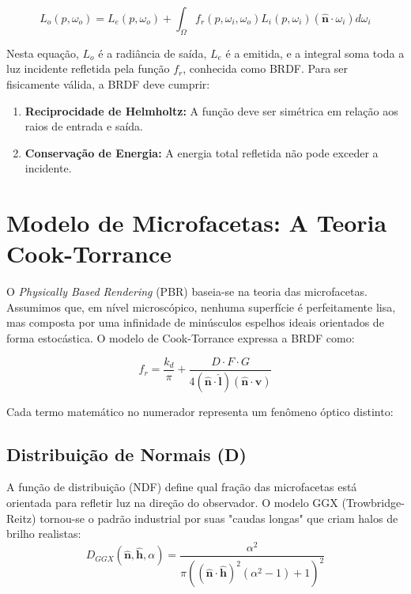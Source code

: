 \begin{equation}
    L_o(p, \omega_o) = L_e(p, \omega_o) + \int_{\Omega} f_r(p, \omega_i, \omega_o) L_i(p, \omega_i) (\hat{\mathbf{n}} \cdot \omega_i) d\omega_i
\end{equation}

Nesta equação, $L_o$ é a radiância de saída, $L_e$ é a emitida, e a integral soma toda a luz incidente refletida pela função $f_r$, conhecida como BRDF. Para ser fisicamente válida, a BRDF deve cumprir:
\begin{enumerate}
    \item \textbf{Reciprocidade de Helmholtz:} A função deve ser simétrica em relação aos raios de entrada e saída.
    \item \textbf{Conservação de Energia:} A energia total refletida não pode exceder a incidente.
\end{enumerate}

\section{Modelo de Microfacetas: A Teoria Cook-Torrance}

O \textit{Physically Based Rendering} (PBR) baseia-se na teoria das microfacetas. Assumimos que, em nível microscópico, nenhuma superfície é perfeitamente lisa, mas composta por uma infinidade de minúsculos espelhos ideais orientados de forma estocástica. O modelo de Cook-Torrance \cite{cook1982reflectance} expressa a BRDF como:

\begin{equation}
    f_r = \frac{k_d}{\pi} + \frac{D \cdot F \cdot G}{4(\hat{\mathbf{n}}\cdot\hat{\mathbf{l}})(\hat{\mathbf{n}}\cdot\hat{\mathbf{v}})}
\end{equation}

Cada termo matemático no numerador representa um fenômeno óptico distinto:

\subsection{Distribuição de Normais (D)}
A função de distribuição (NDF) define qual fração das microfacetas está orientada para refletir luz na direção do observador. O modelo GGX (Trowbridge-Reitz) tornou-se o padrão industrial por suas "caudas longas" que criam halos de brilho realistas:
\begin{equation}
    D_{GGX}(\hat{\mathbf{n}}, \hat{\mathbf{h}}, \alpha) = \frac{\alpha^2}{\pi((\hat{\mathbf{n}}\cdot\hat{\mathbf{h}})^2(\alpha^2-1)+1)^2}
\end{equation}

